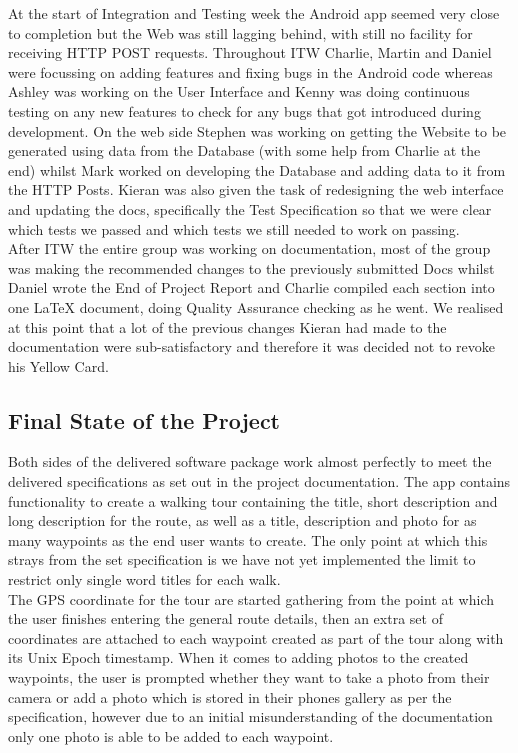 \documentclass{article}
\begin{document}
		At the start of Integration and Testing week the Android app seemed very close to completion but the Web was still lagging behind, with still no facility for receiving HTTP POST requests. Throughout ITW Charlie, Martin and Daniel were focussing on adding features and fixing bugs in the Android code whereas Ashley was working on the User Interface and Kenny was doing continuous testing on any new features to check for any bugs that got introduced during development. On the web side Stephen was working on getting the Website to be generated using data from the Database (with some help from Charlie at the end) whilst Mark worked on developing the Database and adding data to it from the HTTP Posts. Kieran was also given the task of redesigning the web interface and updating the docs, specifically the Test Specification so that we were clear which tests we passed and which tests we still needed to work on passing. \\

		After ITW the entire group was working on documentation, most of the group was making the recommended changes to the previously submitted Docs whilst Daniel wrote the End of Project Report and Charlie compiled each section into one LaTeX document, doing Quality Assurance checking as he went. We realised at this point that a lot of the previous changes Kieran had made to the documentation were sub-satisfactory and therefore it was decided not to revoke his Yellow Card.

		\newpage
		\subsection{Final State of the Project}
		Both sides of the delivered software package work almost perfectly to meet the delivered specifications as set out in the project documentation. 
		The app contains functionality to create a walking tour containing the title, short description and long description for the route, as well as a title, description and photo for as many waypoints as the end user wants to create. The only point at which this strays from the set specification is we have not yet implemented the limit to restrict only single word titles for each walk. \\
		
		The GPS coordinate for the tour are started gathering from the point at which the user finishes entering the general route details, then an extra set of coordinates are attached to each waypoint created as part of the tour along with its Unix Epoch timestamp. When it comes to adding photos to the created waypoints, the user is prompted whether they want to take a photo from their camera or add a photo which is stored in their phones gallery as per the specification, however due to an initial misunderstanding of the documentation only one photo is able to be added to each waypoint. \\
		
\end{document}
